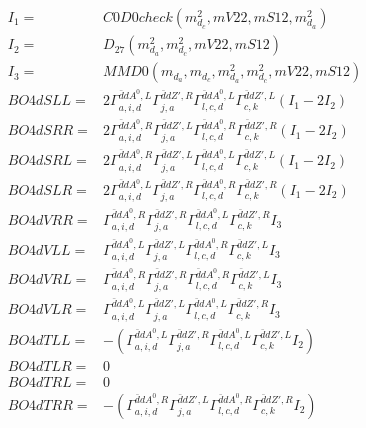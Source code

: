 \documentclass[A4,landscape]{article}
\begin{document}
\begin{align} 
I_1 = & C0D0check(m^2_{d_{{c}}}, mV22, mS12, m^2_{d_{{a}}}) \\ 
I_2 = & D_{27}(m^2_{d_{{a}}}, m^2_{d_{{c}}}, mV22, mS12) \\ 
I_3 = & MMD0(m_{d_{{a}}}, m_{d_{{c}}}, m^2_{d_{{a}}}, m^2_{d_{{c}}}, mV22, mS12) \\ 
  BO4dSLL= & 2  \Gamma^{\bar{d}d A^0 ,L}_{a, i, d} \Gamma^{\bar{d}d {Z'} ,R}_{j, a} \Gamma^{\bar{d}d A^0 ,L}_{l, c, d} \Gamma^{\bar{d}d {Z'} ,L}_{c, k} (I_1 - 2 I_2) \\ 
  BO4dSRR= & 2  \Gamma^{\bar{d}d A^0 ,R}_{a, i, d} \Gamma^{\bar{d}d {Z'} ,L}_{j, a} \Gamma^{\bar{d}d A^0 ,R}_{l, c, d} \Gamma^{\bar{d}d {Z'} ,R}_{c, k} (I_1 - 2 I_2) \\ 
  BO4dSRL= & 2  \Gamma^{\bar{d}d A^0 ,R}_{a, i, d} \Gamma^{\bar{d}d {Z'} ,L}_{j, a} \Gamma^{\bar{d}d A^0 ,L}_{l, c, d} \Gamma^{\bar{d}d {Z'} ,L}_{c, k} (I_1 - 2 I_2) \\ 
  BO4dSLR= & 2  \Gamma^{\bar{d}d A^0 ,L}_{a, i, d} \Gamma^{\bar{d}d {Z'} ,R}_{j, a} \Gamma^{\bar{d}d A^0 ,R}_{l, c, d} \Gamma^{\bar{d}d {Z'} ,R}_{c, k} (I_1 - 2 I_2) \\ 
  BO4dVRR= &  \Gamma^{\bar{d}d A^0 ,R}_{a, i, d} \Gamma^{\bar{d}d {Z'} ,R}_{j, a} \Gamma^{\bar{d}d A^0 ,L}_{l, c, d} \Gamma^{\bar{d}d {Z'} ,R}_{c, k} I_3 \\ 
  BO4dVLL= &  \Gamma^{\bar{d}d A^0 ,L}_{a, i, d} \Gamma^{\bar{d}d {Z'} ,L}_{j, a} \Gamma^{\bar{d}d A^0 ,R}_{l, c, d} \Gamma^{\bar{d}d {Z'} ,L}_{c, k} I_3 \\ 
  BO4dVRL= &  \Gamma^{\bar{d}d A^0 ,R}_{a, i, d} \Gamma^{\bar{d}d {Z'} ,R}_{j, a} \Gamma^{\bar{d}d A^0 ,R}_{l, c, d} \Gamma^{\bar{d}d {Z'} ,L}_{c, k} I_3 \\ 
  BO4dVLR= &  \Gamma^{\bar{d}d A^0 ,L}_{a, i, d} \Gamma^{\bar{d}d {Z'} ,L}_{j, a} \Gamma^{\bar{d}d A^0 ,L}_{l, c, d} \Gamma^{\bar{d}d {Z'} ,R}_{c, k} I_3 \\ 
  BO4dTLL= & -( \Gamma^{\bar{d}d A^0 ,L}_{a, i, d} \Gamma^{\bar{d}d {Z'} ,R}_{j, a} \Gamma^{\bar{d}d A^0 ,L}_{l, c, d} \Gamma^{\bar{d}d {Z'} ,L}_{c, k} I_2) \\ 
  BO4dTLR= & 0 \\ 
  BO4dTRL= & 0 \\ 
  BO4dTRR= & -( \Gamma^{\bar{d}d A^0 ,R}_{a, i, d} \Gamma^{\bar{d}d {Z'} ,L}_{j, a} \Gamma^{\bar{d}d A^0 ,R}_{l, c, d} \Gamma^{\bar{d}d {Z'} ,R}_{c, k} I_2) \\ 
\end{align} 
\end{document}
